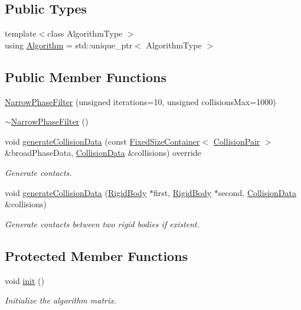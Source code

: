 \subsection*{Public Types}
\begin{DoxyCompactItemize}
\item 
{\footnotesize template$<$class Algorithm\+Type $>$ }\\using \mbox{\hyperlink{classr3_1_1_narrow_phase_filter_aebe310c944167ad73abf098ccc68ed88}{Algorithm}} = std\+::unique\+\_\+ptr$<$ Algorithm\+Type $>$
\end{DoxyCompactItemize}
\subsection*{Public Member Functions}
\begin{DoxyCompactItemize}
\item 
\mbox{\hyperlink{classr3_1_1_narrow_phase_filter_a4384e2d6e5f3e5e90b7bf8fffb3e5171}{Narrow\+Phase\+Filter}} (unsigned iterations=10, unsigned collisions\+Max=1000)
\item 
\mbox{\hyperlink{classr3_1_1_narrow_phase_filter_acd99c99da07750756ae37fa5641136cb}{$\sim$\+Narrow\+Phase\+Filter}} ()
\item 
void \mbox{\hyperlink{classr3_1_1_narrow_phase_filter_a7f7b7a901d5af6e616bc6df677fae086}{generate\+Collision\+Data}} (const \mbox{\hyperlink{classr3_1_1_fixed_size_container}{Fixed\+Size\+Container}}$<$ \mbox{\hyperlink{classr3_1_1_collision_pair}{Collision\+Pair}} $>$ \&broad\+Phase\+Data, \mbox{\hyperlink{classr3_1_1_collision_data}{Collision\+Data}} \&collisions) override
\begin{DoxyCompactList}\small\item\em Generate contacts. \end{DoxyCompactList}\item 
void \mbox{\hyperlink{classr3_1_1_narrow_phase_filter_a567743be66c7e8d118165ec92ed68cdf}{generate\+Collision\+Data}} (\mbox{\hyperlink{classr3_1_1_rigid_body}{Rigid\+Body}} $\ast$first, \mbox{\hyperlink{classr3_1_1_rigid_body}{Rigid\+Body}} $\ast$second, \mbox{\hyperlink{classr3_1_1_collision_data}{Collision\+Data}} \&collisions)
\begin{DoxyCompactList}\small\item\em Generate contacts between two rigid bodies if existent. \end{DoxyCompactList}\end{DoxyCompactItemize}
\subsection*{Protected Member Functions}
\begin{DoxyCompactItemize}
\item 
void \mbox{\hyperlink{classr3_1_1_narrow_phase_filter_a09742dd02960fab328444144fb22b85b}{init}} ()
\begin{DoxyCompactList}\small\item\em Initialize the algorithm matrix. \end{DoxyCompactList}\end{DoxyCompactItemize}

